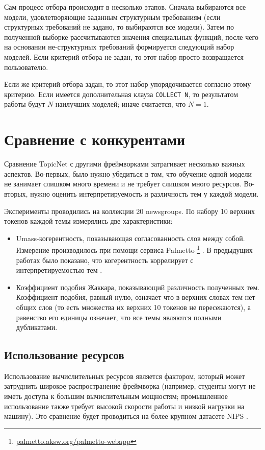 Сам процесс отбора происходит в несколько этапов. Сначала выбираются все модели, удовлетворяющие заданным структурным требованиям (если структурных требований не задано, то выбираются все модели). Затем по полученной выборке рассчитываются значения специальных функций, после чего на основании не-структурных требований формируется следующий набор моделей. Если критерий отбора не задан, то этот набор просто возвращается пользователю.

Если же критерий отбора задан, то этот набор упорядочивается согласно этому критерию. Если 
имеется дополнительная клауза \texttt{COLLECT N}, то результатом работы будут $N$ наилучших моделей; иначе считается, что $N=1$. 

\section{Сравнение с конкурентами}

Сравнение TopicNet с другими фреймворками затрагивает несколько важных аспектов. Во-первых, было нужно убедиться в том, что обучение одной модели не занимает слишком много времени и не требует слишком много ресурсов. Во-вторых, нужно оценить интерпретируемость и различность тем у каждой модели.

Эксперименты проводились на коллекции 20 newsgroups. По набору 10 верхних токенов каждой темы измерялись две характеристики: 
\begin{itemize}
    \item Umass-когерентность, показывающая согласованность слов между собой. Измерение производилось при помощи сервиса Palmetto \footnote{\url{palmetto.aksw.org/palmetto-webapp} } \cite{roder2015exploring}. В предыдущих работах было показано, что когерентность коррелирует с интерпретируемостью тем \cite{mimno2011}.
    \item Коэффициент подобия Жаккара, показывающий различность полученных тем. Коэффициент подобия, равный нулю, означает что в верхних словах тем нет общих слов (то есть множества их верхних 10 токенов не пересекаются), а равенство его единицы означает, что все темы являются полными дубликатами.
\end{itemize}

\subsection{Использование ресурсов}

Использование вычислительных ресурсов является фактором, который может затруднить широкое распространение фреймворка (например, студенты могут не иметь доступа к большим вычислительным мощностям; промышленное  использование также требует высокой скорости работы и низкой нагрузки на машину). Это сравнение будет проводиться на более крупном датасете NIPS \cite{mccallum1996bow}. 
 
